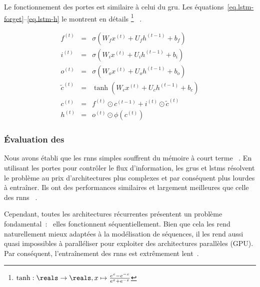 Le fonctionnement des portes est similaire à celui du \gls{gru}.
Les équations~\ref{eq.lstm-forget}--\ref{eq.lstm-h} le montrent en détails%
\footnote{\(\tanh:\reals\to\reals, x\mapsto \frac{e^x - e^{-x}}{e^x + e^{-x}}\)}
~\cite{Hochreiter_Schmidhuber_1997}.

\begin{eqnarray}
    \label{eq.lstm-forget}
    f^{(t)} &=&\sigma\left(W_f x^{(t)}+U_f h^{(t-1)}+b_f\right) \\
    \label{eq.lstm-input}
    i^{(t)} &=&\sigma\left(W_i x^{(t)}+U_i h^{(t-1)}+b_i\right) \\
    \label{eq.lstm-out}
    o^{(t)} &=&\sigma\left(W_o x^{(t)}+U_o h^{(t-1)}+b_o\right) \\
    \label{eq.lstm-ctilde}
    \tilde{c}^{(t)} &=&\tanh\left(W_c x^{(t)}+U_c h^{(t-1)}+b_c\right) \\
    \label{eq.lstm-c}
    c^{(t)} &=&f^{(t)} \odot c^{(t-1)}+i^{(t)} \odot \tilde{c}^{(t)} \\
    \label{eq.lstm-h}
    h^{(t)} &=&o^{(t)} \odot \phi\left(c^{(t)}\right)
\end{eqnarray}

\subsubsection{Évaluation des }

Nous avons établi que les \glspl{rnn} simples souffrent du mémoire à court terme%
~\cite{Bengio_Simard_Frasconi_1994,Pascanu_Mikolov_Bengio}.
En utilisant les portes pour contrôler le flux d'information,
les \glspl{gru} et \glspl{lstm} résolvent le problème au prix d'architectures plus complexes
et par conséquent plus lourdes à entraîner.
Ils ont des performances similaires et largement meilleures que celle des \glspl{rnn}%
~\cite{Chung_Gulcehre_Cho_Bengio_2014}.

Cependant, toutes les architectures récurrentes présentent un problème fondamental~:%
~elles fonctionnent séquentiellement.
Bien que cela les rend naturellement mieux adaptées à la modélisation de séquences,
il les rend aussi quasi impossibles à paralléliser pour exploiter des architectures parallèles (GPU).
Par conséquent, l'entraînement des \glspl{rnn} est extrêmement lent~\cite{Stahlberg_2020}.
